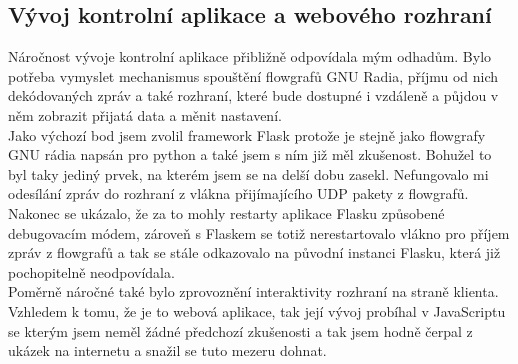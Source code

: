 \documentclass{ctuthesis}
\begin{document}
\subsection{Vývoj kontrolní aplikace a webového rozhraní}
Náročnost vývoje kontrolní aplikace přibližně odpovídala mým odhadům. Bylo potřeba vymyslet mechanismus spouštění flowgrafů GNU Radia, příjmu od nich dekódovaných zpráv a také rozhraní, které bude dostupné i vzdáleně a půjdou v něm zobrazit přijatá data a měnit nastavení. \\
Jako výchozí bod jsem zvolil framework Flask protože je stejně jako flowgrafy GNU rádia napsán pro python a také jsem s ním již měl zkušenost. Bohužel to byl taky jediný prvek, na kterém jsem se na delší dobu zasekl. Nefungovalo mi odesílání zpráv do rozhraní z vlákna přijímajícího UDP pakety z flowgrafů. Nakonec se ukázalo, že za to mohly restarty aplikace Flasku způsobené debugovacím módem, zároveň s Flaskem se totiž nerestartovalo vlákno pro příjem zpráv z flowgrafů a tak se stále odkazovalo na původní instanci Flasku, která již pochopitelně neodpovídala.
\\ Poměrně náročné také bylo zprovoznění interaktivity rozhraní na straně klienta. Vzhledem k tomu, že je to webová aplikace, tak její vývoj probíhal v JavaScriptu se kterým jsem neměl žádné předchozí zkušenosti a tak jsem hodně čerpal z ukázek na internetu a snažil se tuto mezeru dohnat.
\end{document}
